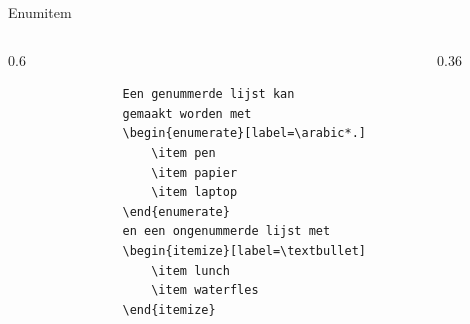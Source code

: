 \begin{frame}[fragile, t]{Enumitem}
	\begin{columns}[t]
		\hspace{-0.6\textwidth}
		\begin{column}{0.6\textwidth}
			\begin{verbatim}
				Een genummerde lijst kan 
				gemaakt worden met
				\begin{enumerate}[label=\arabic*.]
					\item pen
					\item papier
					\item laptop
				\end{enumerate}
				en een ongenummerde lijst met
				\begin{itemize}[label=\textbullet]
					\item lunch
					\item waterfles
				\end{itemize}
			\end{verbatim}
			\par
		\end{column}
		\hspace{0.6\textwidth}
		\begin{column}{0.36\textwidth}
			\vspace{1mm}
		\end{column}
		
	\end{columns} 
\end{frame}

